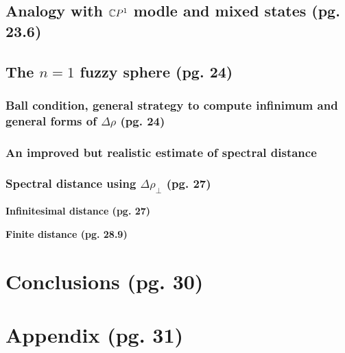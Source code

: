 \documentclass{article}
\begin{document}
\subsection{Analogy with $\mathbb{C} P^1$ modle and mixed states (pg. 23.6)}


\subsection{The $n=1$ fuzzy sphere (pg. 24)}

\subsubsection{Ball condition, general strategy to compute infinimum and general forms of $\Delta \rho$ (pg. 24)}%

\subsubsection{An improved but realistic estimate of spectral distance}%

\subsubsection{Spectral distance using $\Delta \rho_{\perp}$ (pg. 27)}%

\textbf{Infinitesimal distance (pg. 27)}

\textbf{Finite distance (pg. 28.9)}




\section{Conclusions (pg. 30)}

\section{Appendix (pg. 31)}

\end{document}
